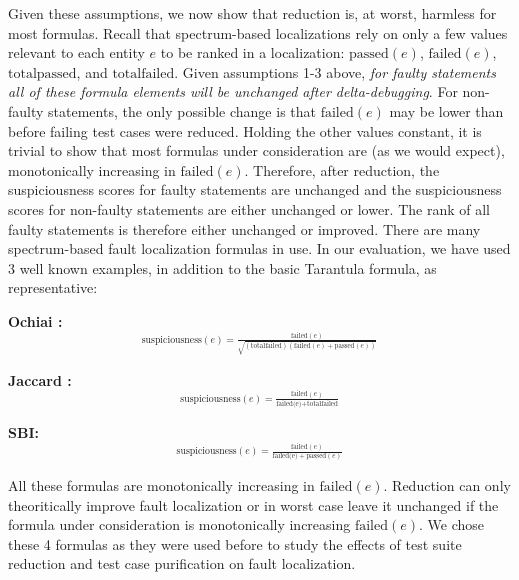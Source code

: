 Given these assumptions, we now show that reduction is, at worst,
harmless for most formulas.  Recall that spectrum-based localizations
rely on only a few values relevant to each entity $e$ to be ranked in
a localization: $\text{passed}(e)$, $\text{failed}(e)$,
$\text{totalpassed}$, and $\text{totalfailed}$.  Given assumptions 1-3
above, \emph{for faulty statements all of these formula elements will
be unchanged after delta-debugging}.  For non-faulty statements, the
only possible change is that $ \text{failed}(e)$ may be lower than
before failing test cases were reduced. Holding the other values
constant, it is trivial to show that most formulas under consideration
are (as we would expect), monotonically increasing in
$\text{failed}(e)$.  Therefore, after reduction, the suspiciousness
scores for faulty statements are unchanged and the suspiciousness
scores for non-faulty statements are either unchanged or lower.  The
rank of all faulty statements is therefore either unchanged or
improved.  There are many spectrum-based fault localization formulas
in use. In our evaluation, we have used 3 well known examples, in
addition to the basic Tarantula \cite{Jones2002} formula, as
representative:

{\bf Ochiai \cite{Ochai}:}
$$ ^{  \text{suspiciousness}(e) = \frac{\text{failed}(e)}{\sqrt{(\text{totalfailed}) (\text{failed}(e) + \text{passed}(e))}} } $$

{\bf Jaccard \cite{Pinpoint}:}
$$ ^{ \text{suspiciousness}(e) = \frac{\text{failed}(e)}{\text{failed(e)} + \text{totalfailed}}  } $$

{\bf SBI: \cite{EmpirReduce,StatDebug}}
$$ ^{ \text{suspiciousness}(e) = \frac{\text{failed}(e)}{\text{failed(e)} + \text{passed}(e)}  } $$


All these formulas are monotonically increasing in
$\text{failed}(e)$.%
Reduction can only
theoritically improve fault localization or in worst case leave it
unchanged if the formula under consideration is monotonically
increasing $\text{failed}(e)$. We chose these 4 formulas as they were
used before to study the effects of test suite reduction
\cite{EmpirReduce} and test case purification
\cite{PureTest} on fault localization.



